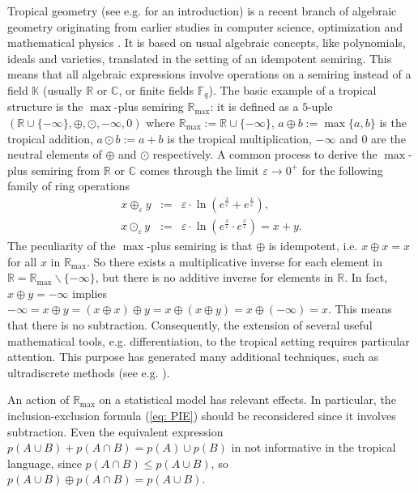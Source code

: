 \documentclass[11pt,british,reqno]{article}
\numberwithin{equation}{section}
\numberwithin{figure}{section}
\numberwithin{table}{section}
\theoremstyle{definition}
\theoremstyle{definition}
\theoremstyle{plain}
\theoremstyle{plain}
\theoremstyle{remark}
\theoremstyle{plain}
\numberwithin{equation}{section}
\numberwithin{figure}{section}
\numberwithin{table}{section}
\theoremstyle{plain}
\begin{document}
Tropical geometry (see e.g. \cite{MS2015} for an introduction) is
a recent branch of algebraic geometry originating from earlier studies
in computer science, optimization and mathematical physics \cite{Cohen1999,Inoue2012,LS2014}.
It is based on usual algebraic concepts, like polynomials, ideals
and varieties, translated in the setting of an idempotent semiring.
This means that all algebraic expressions involve operations on a
semiring instead of a field $\mathbb{K}$ (usually
$\mathbb{R}$ or $\mathbb{C}$, or finite fields $\mathbb{F}_{q}$).
The basic example of a tropical structure is the $\max$-plus semiring $\mathbb{R}_{\max}$: it is defined as a $5$-uple $(\mathbb{R}\cup\{-\infty\},\oplus,\odot,-\infty,0)$
where $\mathbb{R}_{\max}:=\mathbb{R}\cup\{-\infty\}$, $a\oplus b:=\max\{a,b\}$
is the tropical addition, $a\odot b:=a+b$ is the tropical multiplication,
 $-\infty$ and $0$ are the neutral elements of
$\oplus$ and $\odot$ respectively. A common process to derive the $\max$-plus semiring from $\mathbb{R}$ or $\mathbb{C}$ comes through the limit
$\varepsilon\rightarrow0^{+}$ for the following family of ring operations
\begin{eqnarray}
x\oplus_{\varepsilon}y & := & \varepsilon\cdot\ln\left(e^{\frac{x}{\varepsilon}}+e^{\frac{x}{\varepsilon}}\right),\nonumber \\
x\odot_{\varepsilon}y & := &\varepsilon\cdot\ln\left(e^{\frac{x}{\varepsilon}}\cdot e^{\frac{x}{\varepsilon}}\right)=x+y.
\label{eq: tropical limit}
\end{eqnarray}
The peculiarity of the $\max$-plus semiring is that $\oplus$ is
idempotent, i.e. $x\oplus x=x$ for all $x$ in $\mathbb{R}_{\max}$.
So there exists a multiplicative inverse for each element in $\mathbb{R}=\mathbb{R}_{\max}\backslash\{-\infty\}$,
but there is no additive inverse for elements in $\mathbb{R}$. In
fact, $x\oplus y=-\infty$ implies $-\infty=x\oplus y=(x\oplus x)\oplus y=x\oplus(x\oplus y)=x\oplus(-\infty)=x$.
This means that there is no subtraction. Consequently, the extension of several useful mathematical tools, e.g. differentiation, to the tropical setting requires particular attention. This purpose has generated many additional techniques, such as ultradiscrete methods (see e.g. \cite{Grammaticos1997,Inoue2012}).  

An action of $\mathbb{R}_{\max}$ on a statistical model has relevant effects. In particular, the inclusion-exclusion formula (\ref{eq: PIE}) should be reconsidered since it involves subtraction. Even the equivalent expression $p(A\cup B)+p(A\cap B)=p(A)\cup p(B)$ in not informative in the tropical language, since $p(A\cap B)\leq p(A\cup B)$,
so $p(A\cup B)\oplus p(A\cap B)=p(A\cup B)$. 
\end{document}
